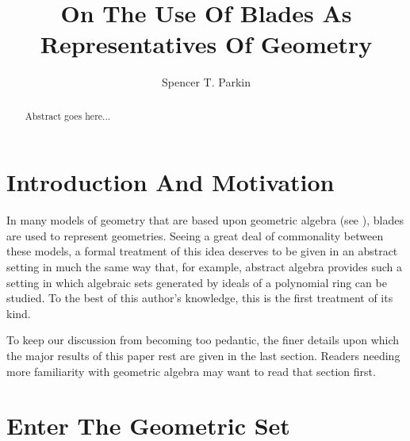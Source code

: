 \documentclass{birkjour}
\theoremstyle{definition}
\theoremstyle{remark}
\numberwithin{equation}{section}
\begin{document}
\title{On The Use Of Blades As Representatives Of Geometry}

\author{Spencer T. Parkin}
\address{102 W. 500 S., \\
Salt Lake City, UT  84101} 



\begin{abstract}
Abstract goes here...
\end{abstract}


\maketitle

\section{Introduction And Motivation}

In many models of geometry that are based upon geometric algebra (see \cite{}), blades are used
to represent geometries.  Seeing a great deal of commonality between these models, a formal
treatment of this idea deserves to be given in an abstract setting in much the same way that,
for example, abstract algebra provides such a setting in which algebraic sets generated by ideals
of a polynomial ring can be studied.  To the best of this author's knowledge, this is the first treatment of its kind.

To keep our discussion from becoming too pedantic, the finer details upon which the major results of this paper rest are given
in the last section.  Readers needing more familiarity with geometric algebra may want to read that section first.

\section{Enter The Geometric Set}
\end{document}
